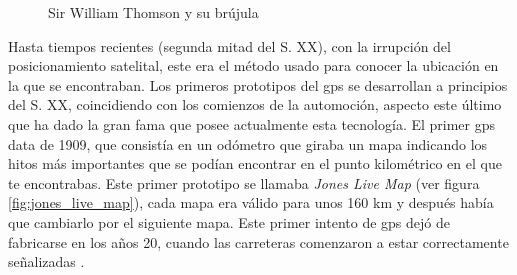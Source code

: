 \begin{figure}[h!btp]
	\begin{adjustbox}{minipage=\linewidth, fbox}
		\centering
		\hspace{10mm}
	\end{adjustbox}
	\caption{Sir William Thomson y su brújula}
	\label{fig:william_thomson}
\end{figure}



Hasta tiempos recientes (segunda mitad del S. XX), con la irrupción del posicionamiento satelital, este era el método usado para conocer la ubicación en la que se encontraban.
Los primeros prototipos del gps se desarrollan a principios del S. XX, coincidiendo con los comienzos de la automoción, aspecto este último que ha dado la gran fama que posee actualmente esta tecnología.
El primer gps data de 1909, que consistía en un odómetro que giraba un mapa indicando los hitos más importantes que se podían encontrar en el punto kilométrico en el que te encontrabas.
Este primer prototipo se llamaba \textit{Jones Live Map} (ver figura \ref{fig:jones_live_map}), cada mapa era válido para unos 160 km y después había que cambiarlo por el siguiente mapa. Este primer intento de gps dejó de fabricarse en los años 20, cuando las carreteras comenzaron a estar correctamente señalizadas \cite{GPS12}.

